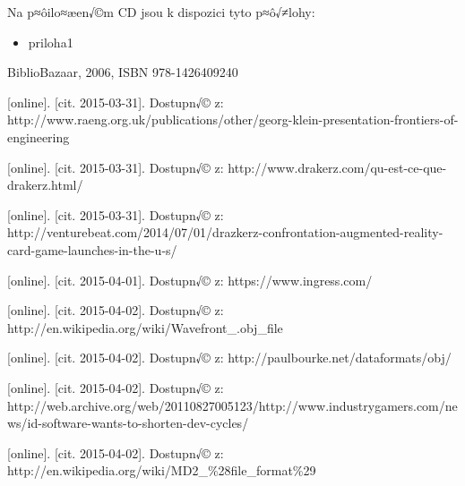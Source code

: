 \documentclass[twoside,12pt]{article}
\begin{document}
%
%
Na p≈ôilo≈æen√©m CD jsou k dispozici tyto p≈ô√≠lohy: 
\begin{itemize}
\item priloha1
\end{itemize}


% 
% 
\begin{literatura}

 {
	BiblioBazaar, 2006, ISBN 978-1426409240
}


{
	 [online]. [cit. 2015-03-31]. Dostupn√© z: 		http://www.raeng.org.uk/publications/other/georg-klein-presentation-frontiers-of-engineering
}

{
	 [online]. [cit. 2015-03-31]. Dostupn√© z: http://www.drakerz.com/qu-est-ce-que-drakerz.html/
}

{
	 [online]. [cit. 2015-03-31]. Dostupn√© z: http://venturebeat.com/2014/07/01/drazkerz-confrontation-augmented-reality-card-game-launches-in-the-u-s/
}

{
	 [online]. [cit. 2015-04-01]. Dostupn√© z: https://www.ingress.com/
}

{
	 [online]. [cit. 2015-04-02]. Dostupn√© z: http://en.wikipedia.org/wiki/Wavefront\_.obj\_file
}

{
	 [online]. [cit. 2015-04-02]. Dostupn√© z: http://paulbourke.net/dataformats/obj/
}

{
	 [online]. [cit. 2015-04-02]. Dostupn√© z: http://web.archive.org/web/20110827005123/http://www.industrygamers.com/news/id-software-wants-to-shorten-dev-cycles/
}

{
	 [online]. [cit. 2015-04-02]. Dostupn√© z: http://en.wikipedia.org/wiki/MD2\_\%28file\_format\%29
}


\end{literatura}
\end{document}
